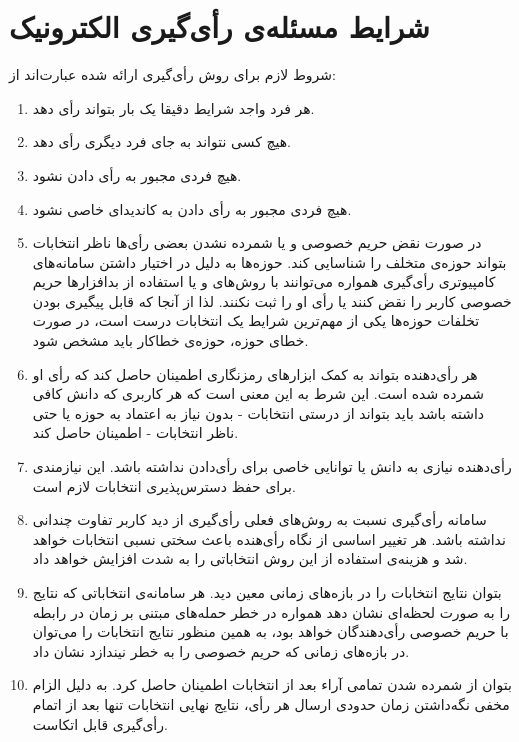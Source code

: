 \section{شرایط مسئله‌ی رأی‌گیری الکترونیک}
شروط لازم برای روش‌ رأی‌گیری ارائه شده عبارت‌اند از:  
\begin{enumerate}
	\item 
	هر فرد واجد شرایط دقیقا یک بار بتواند رأی دهد.
	\item 
	هیچ کسی نتواند به جای فرد دیگری رأی دهد.
	\item 
	هیچ فردی مجبور به رأی دادن نشود.
	\item 
	هیچ فردی مجبور به رأی دادن به کاندیدای خاصی نشود.
	\item 
	در صورت نقض حریم خصوصی و یا شمرده نشدن بعضی رأی‌ها ناظر انتخابات بتواند حوزه‌ی متخلف را شناسایی کند. حوزه‌ها به دلیل در اختیار داشتن سامانه‌های کامپیوتری رأی‌گیری همواره می‌توانند با روش‌های 
	و یا استفاده از بد‌افزار‌ها حریم خصوصی کاربر را نقض کنند یا رأی او را ثبت نکنند. لذا از آنجا که قابل پیگیری بودن تخلفات حوزه‌ها یکی از مهم‌ترین شرایط یک انتخابات درست است، در صورت خطای حوزه، حوزه‌ی خطاکار باید مشخص شود.
	\item 
	هر رأی‌دهنده بتواند به کمک ابزارهای رمزنگاری اطمینان حاصل کند که رأی او شمرده شده است. این شرط به این معنی است که هر کاربری که دانش کافی داشته باشد باید بتواند از درستی انتخابات - بدون نیاز به اعتماد به حوزه یا حتی ناظر انتخابات - اطمینان حاصل کند. 
	\item
	رأی‌دهنده نیازی به دانش یا توانایی خاصی برای رأی‌دادن نداشته باشد. این نیازمندی برای حفظ دسترس‌پذیری انتخابات لازم است.
	\item
	سامانه رأی‌گیری نسبت به روش‌های فعلی رأی‌گیری از دید کاربر تفاوت چندانی نداشته باشد. هر تغییر اساسی از نگاه رأی‌هنده باعث سختی نسبی انتخابات خواهد شد و هزینه‌ی  استفاده از این روش انتخاباتی را به شدت افزایش خواهد داد.
	\item 
	بتوان نتایج انتخابات را در بازه‌های زمانی معین دید. هر سامانه‌ی انتخاباتی که نتایج را به صورت لحظه‌ای نشان دهد همواره در خطر حمله‌های مبتنی بر زمان در رابطه با حریم خصوصی رأی‌دهندگان خواهد بود، به همین منظور نتایج انتخابات را می‌توان در بازه‌های زمانی که حریم خصوصی را به خطر نیندازد نشان داد.
	\item 
	بتوان از شمرده شدن تمامی آراء بعد از انتخابات اطمینان حاصل کرد. به دلیل الزام مخفی نگه‌داشتن زمان حدودی ارسال هر رأی، نتایج نهایی انتخابات تنها بعد از اتمام رأی‌گیری قابل اتکاست.
\end{enumerate}

